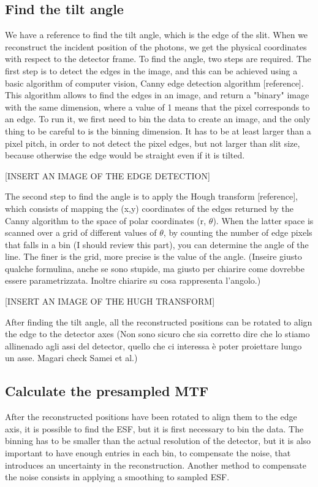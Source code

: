 \subsection{Find the tilt angle}
We have a reference to find the tilt angle, which is the edge of the slit. When we reconstruct the incident position of the photons, we get the physical coordinates with respect to the detector frame. To find the angle, two steps are required. The first step is to detect the edges in the image, and this can be achieved using a basic algorithm of computer vision, Canny edge detection algorithm [reference]. This algorithm allows to find the edges in an image, and return a "binary" image with the same dimension, where a value of 1 means that the pixel corresponds to an edge. To run it, we first need to bin the data to create an image, and the only thing to be careful to is the binning dimension. It has to be at least larger than a pixel pitch, in order to not detect the pixel edges, but not larger than slit size, because otherwise the edge would be straight even if it is tilted.

[INSERT AN IMAGE OF THE EDGE DETECTION]

The second step to find the angle is to apply the Hough transform [reference], which consists of mapping the (x,y) coordinates of the edges returned by the Canny algorithm to the space of polar coordinates (r, $\theta$). When the latter space is scanned over a grid of different values of $\theta$, by counting the number of edge pixels that falls in a bin (I should review this part), you can determine the angle of the line. The finer is the grid, more precise is the value of the angle. (Inseire giusto qualche formulina, anche se sono stupide, ma giusto per chiarire come dovrebbe essere parametrizzata. Inoltre chiarire su cosa rappresenta l'angolo.)

[INSERT AN IMAGE OF THE HUGH TRANSFORM]

After finding the tilt angle, all the reconstructed positions can be rotated to align the edge to the detector axes (Non sono sicuro che sia corretto dire che lo stiamo allinenado agli assi del detector, quello che ci interessa è poter proiettare lungo un asse. Magari check Samei et al.)

\subsection{Calculate the presampled MTF}

After the reconstructed positions have been rotated to align them to the edge axis, it is possible to find the ESF, but it is first necessary to bin the data. The binning has to be smaller than the actual resolution of the detector, but it is also important to have enough entries in each bin, to compensate the noise, that introduces an uncertainty in the reconstruction. Another method to compensate the noise consists in applying a smoothing to sampled ESF.

